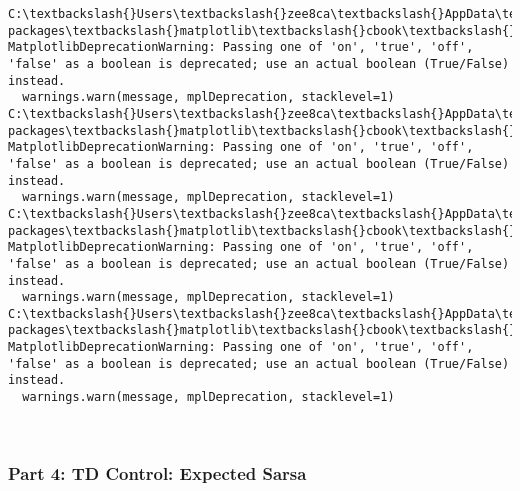 \documentclass[11pt]{article}
\begin{document}
    \begin{Verbatim}[commandchars=\\\{\}]
C:\textbackslash{}Users\textbackslash{}zee8ca\textbackslash{}AppData\textbackslash{}Local\textbackslash{}Continuum\textbackslash{}anaconda3\textbackslash{}lib\textbackslash{}site-packages\textbackslash{}matplotlib\textbackslash{}cbook\textbackslash{}deprecation.py:107: MatplotlibDeprecationWarning: Passing one of 'on', 'true', 'off', 'false' as a boolean is deprecated; use an actual boolean (True/False) instead.
  warnings.warn(message, mplDeprecation, stacklevel=1)
C:\textbackslash{}Users\textbackslash{}zee8ca\textbackslash{}AppData\textbackslash{}Local\textbackslash{}Continuum\textbackslash{}anaconda3\textbackslash{}lib\textbackslash{}site-packages\textbackslash{}matplotlib\textbackslash{}cbook\textbackslash{}deprecation.py:107: MatplotlibDeprecationWarning: Passing one of 'on', 'true', 'off', 'false' as a boolean is deprecated; use an actual boolean (True/False) instead.
  warnings.warn(message, mplDeprecation, stacklevel=1)
C:\textbackslash{}Users\textbackslash{}zee8ca\textbackslash{}AppData\textbackslash{}Local\textbackslash{}Continuum\textbackslash{}anaconda3\textbackslash{}lib\textbackslash{}site-packages\textbackslash{}matplotlib\textbackslash{}cbook\textbackslash{}deprecation.py:107: MatplotlibDeprecationWarning: Passing one of 'on', 'true', 'off', 'false' as a boolean is deprecated; use an actual boolean (True/False) instead.
  warnings.warn(message, mplDeprecation, stacklevel=1)
C:\textbackslash{}Users\textbackslash{}zee8ca\textbackslash{}AppData\textbackslash{}Local\textbackslash{}Continuum\textbackslash{}anaconda3\textbackslash{}lib\textbackslash{}site-packages\textbackslash{}matplotlib\textbackslash{}cbook\textbackslash{}deprecation.py:107: MatplotlibDeprecationWarning: Passing one of 'on', 'true', 'off', 'false' as a boolean is deprecated; use an actual boolean (True/False) instead.
  warnings.warn(message, mplDeprecation, stacklevel=1)

    \end{Verbatim}

    \begin{center}
    \end{center}
    { \hspace*{\fill} \\}
    
    \subsubsection{Part 4: TD Control: Expected
Sarsa}\label{part-4-td-control-expected-sarsa}
\end{document}
